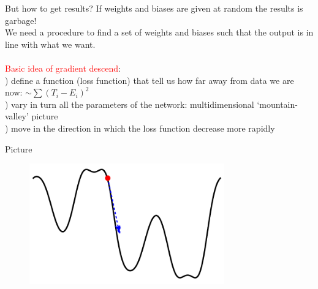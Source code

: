 \documentclass[10pt]{beamer}
\newcommand{\red}[1]{\textcolor{red}{#1}}
\renewcommand{\[}{\begin{equation*}}
\renewcommand{\]}{\end{equation*}}
\begin{document}
\begin{frame}{But how to get results?}
If weights and biases are given at random the results is garbage!\\
We need a procedure to find a set of weights and biases such that the output is in line with what we want.\\
$ $\\
\red{Basic idea of gradient descend}:\\
) define a function (loss function) that tell us how far away from data we are now: $\sim \sum (T_i - E_i)^2$\\
) vary in turn all the parameters of the network: multidimensional `mountain-valley' picture \\
) move in the direction in which the loss function decrease more rapidly
\end{frame}

\begin{frame}{Picture}
\begin{figure}
    \centering
    \includegraphics[width=0.75\textwidth]{Notes/Figures/gradient.pdf}
\end{figure}
\end{frame}



\end{document}
